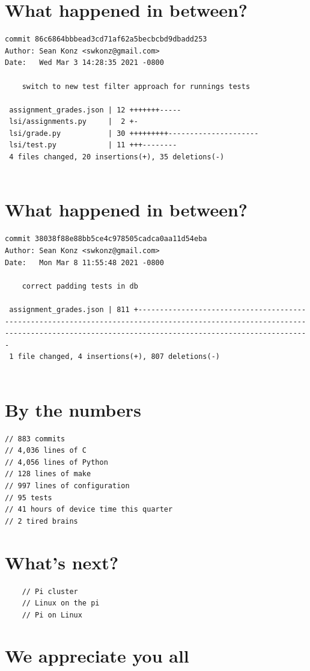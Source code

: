 \documentclass{article}
\begin{document}
\newpage


\section*{What happened in between?}
\vspace{2ex}
\begin{verbatim}
commit 86c6864bbbead3cd71af62a5becbcbd9dbadd253
Author: Sean Konz <swkonz@gmail.com>
Date:   Wed Mar 3 14:28:35 2021 -0800

    switch to new test filter approach for runnings tests

 assignment_grades.json | 12 +++++++-----
 lsi/assignments.py     |  2 +-
 lsi/grade.py           | 30 +++++++++---------------------
 lsi/test.py            | 11 +++--------
 4 files changed, 20 insertions(+), 35 deletions(-)


\end{verbatim}

\newpage

\section*{What happened in between?}
\vspace{2ex}
\begin{verbatim}
commit 38038f88e88bb5ce4c978505cadca0aa11d54eba
Author: Sean Konz <swkonz@gmail.com>
Date:   Mon Mar 8 11:55:48 2021 -0800

    correct padding tests in db

 assignment_grades.json | 811 +------------------------------------------------------------------------------------------------------------------------------------------------------------------------------------
 1 file changed, 4 insertions(+), 807 deletions(-)


\end{verbatim}

\newpage

\section*{By the numbers}
\vspace{2ex}
\begin{verbatim}
// 883 commits 
// 4,036 lines of C
// 4,056 lines of Python
// 128 lines of make
// 997 lines of configuration
// 95 tests
// 41 hours of device time this quarter
// 2 tired brains
\end{verbatim}

\newpage

\section*{What's next?}
\vspace{2ex}
\begin{verbatim}
    // Pi cluster
    // Linux on the pi
    // Pi on Linux
\end{verbatim}
\newpage

\section*{We appreciate you all}

\newpage
\end{document}

